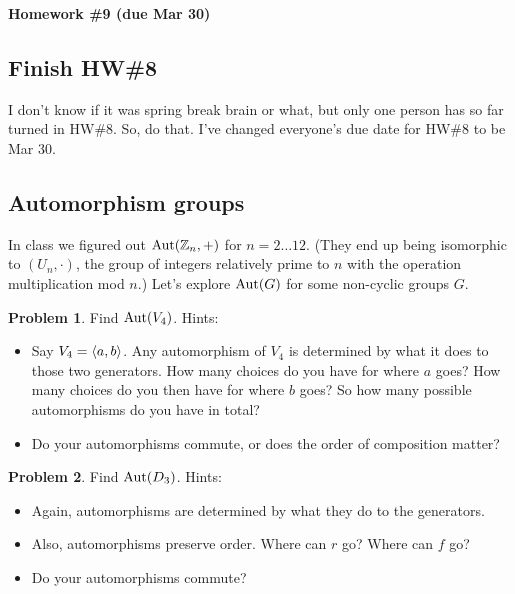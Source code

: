 \documentclass[12pt]{article}
\theoremstyle{definition} %
\newtheorem{problem}{Problem}
\renewcommand{\section}[1]{\begin{center} \textbf{#1} \\\end{center}}
\begin{document}
\section{Homework \#9 (due Mar 30)} %

\subsection*{Finish HW\#8}

I don't know if it was spring break brain or what, but only one person has so far turned in HW\#8. So, do that. I've changed everyone's due date for HW\#8 to be Mar 30.

\subsection*{Automorphism groups}

In class we figured out \(\operatorname{Aut}(\mathbb{Z}_n, +)\) for $n = 2 \ldots 12$. (They end up being isomorphic to $(U_n, \cdot)$, the group of integers relatively prime to $n$ with the operation multiplication mod $n$.) Let's explore $\operatorname{Aut}(G)$ for some non-cyclic groups $G$.

\begin{problem}
    Find $\operatorname{Aut}(V_4)$. Hints:
    \begin{itemize}
        \item Say $V_4 = \langle a, b\rangle$. Any automorphism of $V_4$ is determined by what it does to those two generators. How many choices do you have for where $a$ goes? How many choices do you then have for where $b$ goes? So how many possible automorphisms do you have in total?
        \item Do your automorphisms commute, or does the order of composition matter?
    \end{itemize}
\end{problem}

\begin{problem}
    Find $\operatorname{Aut}(D_3)$. Hints:
    \begin{itemize}
        \item Again, automorphisms are determined by what they do to the generators.
        \item Also, automorphisms preserve order. Where can $r$ go? Where can $f$ go?
        \item Do your automorphisms commute?
    \end{itemize}
\end{problem}
\end{document}
